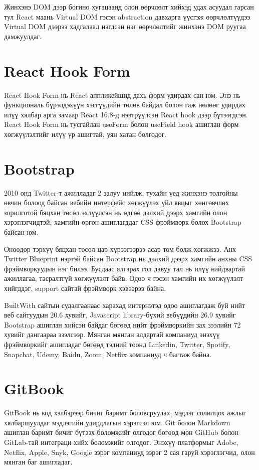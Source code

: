 Жинхэнэ DOM дээр богино хугацаанд олон өөрчлөлт хийхэд удах асуудал гарсан тул React маань Virtual DOM гэсэн abstraction давхарга үүсгэж өөрчлөлтүүдээ Virtual DOM дээрээ хадгалаад нэгдсэн нэг өөрчлөлтийг жинхэнэ DOM руугаа дамжуулдаг.

\section{React Hook Form}
React Hook Form нь React аппликейшнд дахь форм удирдах сан юм. Энэ нь функциональ бүрэлдэхүүн хэсгүүдийн төлөв байдал болон гаж нөлөөг удирдах илүү хялбар арга замаар React 16.8-д нэвтрүүлсэн React hook дээр бүтээгдсэн. React Hook Form нь тусгайлан useForm болон useField hook ашиглан форм хөгжүүлэлтийг илүү үр ашигтай, уян хатан болгодог.

\section{Bootstrap}
2010 онд Twitter-т ажилладаг 2 залуу нийлж, тухайн үед жинхэнэ толгойны өвчин болоод байсан вебийн интерфейс хөгжүүлэх үйл явцыг хөнгөвчлөх зорилготой бяцхан төсөл эхлүүлсэн нь өдгөө дэлхий дээрх хамгийн олон хэрэглэгчидтэй, хамгийн өргөн ашиглагддаг CSS фрэймворк болох Bootstrap байсан юм.

Өнөөдөр тэрхүү бяцхан төсөл цар хүрээгээрээ асар том болж хөгжжээ. Анх Twitter Blueprint нэртэй байсан Bootstrap нь дэлхий дээрх хамгийн анхны CSS фрэймворкуудын нэг билээ. Бусдаас ялгарах гол давуу тал нь илүү найдвартай ажиллагаа, тасралтгүй хөгжүүлэлт байв. Одоо ч гэсэн хамгийн их хөгжүүлэлт хийгддэг, support сайтай фрэймворк хэвээрээ байна.

BuiltWith сайтын судалгаанаас харахад интернэтэд одоо ашиглагдаж буй нийт веб сайтуудын 20.6 хувийг, Javascript library-бүхий вебүүдийн 26.9 хувийг Bootstrap ашиглан хийсэн байдаг бөгөөд нийт фрэймворкийн зах зээлийн 72 хувийг дангаараа эзэлсээр. Мянган мянган алдартай компаниуд энэхүү фрэймворкийг ашигладаг бөгөөд тэдний тоонд Linkedin, Twitter, Spotify, Snapchat, Udemy, Baidu, Zoom, Netflix компаниуд ч багтаж байна.

\section{GitBook}
GitBook нь код хэлбэрээр бичиг баримт боловсруулах, мэдлэг солилцох ажлыг хялбаршуулдаг мэдлэгийн удирдлагын хэрэгсэл юм. Git болон Markdown ашиглан баримт бичиг бүтээх боломжийг олгодог бөгөөд мөн GitHub болон GitLab-тай интеграци хийх боломжийг олгодог. Энэхүү платформыг Adobe, Netflix, Apple, Snyk, Google зэрэг компаниуд зэрэг 2 сая гаруй хэрэглэгчид, олон мянган баг ашигладаг.

